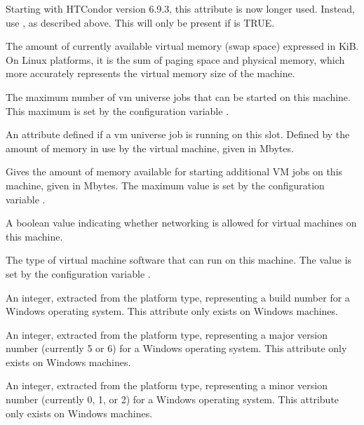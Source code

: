 \begin{description}
Starting with HTCondor version 6.9.3, this attribute is now longer used.
Instead, use , as described above.
This will only be present if  is TRUE.
%
\item[\AdAttr{VirtualMemory}:] The amount of currently available virtual memory 
(swap space) expressed in KiB.
On Linux platforms, it is the sum of paging space and physical memory, 
which more accurately represents the virtual memory size of the machine. 
%
\item[\AdAttr{VM\_AvailNum}:] The maximum number of vm universe jobs that
can be started on this machine. This maximum is set by the configuration
variable . 
%
\item[\AdAttr{VM\_Guest\_Mem}:] An attribute defined if a vm universe job
is running on this slot.  Defined by the amount of memory in use by the 
virtual machine, given in Mbytes.
%
\item[\AdAttr{VM\_Memory}:] Gives the amount of memory available for starting 
additional VM jobs on this machine, given in Mbytes.
The maximum value is set by the configuration variable .
%
\item[\AdAttr{VM\_Networking}:] A boolean value indicating whether networking 
is allowed for virtual machines on this machine.
%
\item[\AdAttr{VM\_Type}:] The type of virtual machine software that can run
on this machine.  The value is set by the configuration variable
.
%
\item[\AdAttr{WindowsBuildNumber}:] An integer, extracted from the
platform type, representing a build number 
for a Windows operating system.
This attribute only exists on Windows machines.
%
\item[\AdAttr{WindowsMajorVersion}:] An integer, extracted from the
platform type, representing a major version number (currently 5 or 6)
for a Windows operating system.
This attribute only exists on Windows machines.
%
\item[\AdAttr{WindowsMinorVersion}:] An integer, extracted from the
platform type, representing a minor version number (currently 0, 1, or 2)
for a Windows operating system.
This attribute only exists on Windows machines.

\end{description}

